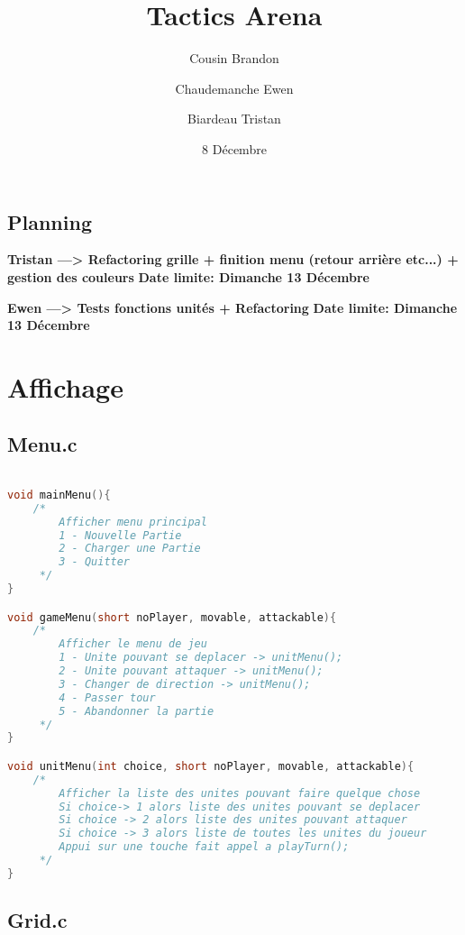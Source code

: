 \documentclass[a4paper,10pt]{extreport}
\begin{document}
\title{Tactics Arena}
\author{Cousin Brandon \and Chaudemanche Ewen \and Biardeau Tristan}
\date{8 Décembre} 

\maketitle
\chapter{Planning}

\textbf{Tristan ---> Refactoring grille + finition menu (retour arrière etc...) + gestion des couleurs}
\smallbreak
\textbf{Date limite: Dimanche 13 Décembre}

\bigbreak
\textbf{Ewen ---> Tests fonctions unités + Refactoring}
\smallbreak
\textbf{Date limite: Dimanche 13 Décembre}

\part{Affichage}

\chapter{Menu.c}
\vspace{-1cm}

\begin{lstlisting}[language=c]

void mainMenu(){
	/*
		Afficher menu principal
		1 - Nouvelle Partie
		2 - Charger une Partie
		3 - Quitter
	 */
}

void gameMenu(short noPlayer, movable, attackable){
	/*
		Afficher le menu de jeu
		1 - Unite pouvant se deplacer -> unitMenu();
		2 - Unite pouvant attaquer -> unitMenu();
		3 - Changer de direction -> unitMenu();
		4 - Passer tour
		5 - Abandonner la partie
	 */
}

void unitMenu(int choice, short noPlayer, movable, attackable){
	/*
		Afficher la liste des unites pouvant faire quelque chose
		Si choice-> 1 alors liste des unites pouvant se deplacer
		Si choice -> 2 alors liste des unites pouvant attaquer
		Si choice -> 3 alors liste de toutes les unites du joueur
		Appui sur une touche fait appel a playTurn();
	 */
}
\end{lstlisting}

\chapter{Grid.c}
\vspace{-1cm}
\end{document}
